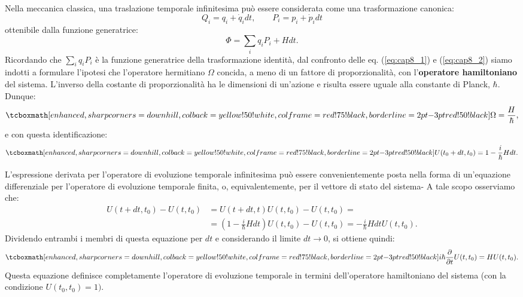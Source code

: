 \documentclass[a4paper,12pt,oneside]{book}
\begin{document}
Nella meccanica classica, una traslazione temporale infinitesima può essere considerata come una trasformazione canonica:
\begin{equation}
Q_i = q_i+\dot{q}_idt, \qquad P_i = p_i+\dot{p}_idt
\end{equation}
ottenibile dalla funzione generatrice:
\begin{equation}
\Phi = \sum _i q_iP_i+ Hdt.
\label{eq:cap8_2}
\end{equation}
Ricordando che $\sum _i q_iP_i$ è la funzione generatrice della trasformazione identità, dal confronto delle eq. (\ref{eq:cap8_1}) e (\ref{eq:cap8_2}) siamo indotti a formulare l'ipotesi che l'operatore hermitiano $\Omega$ concida, a meno di un fattore di proporzionalità, con l'\textbf{operatore hamiltoniano} del sistema. L'inverso della costante di proporzionalità ha le dimensioni di un'azione e risulta essere uguale alla constante di Planck, $\hbar$. Dunque:
	\begin{equation}
		\tcboxmath[enhanced, sharp corners=downhill, colback=yellow!50!white, colframe=red!75!black, borderline={2pt}{-3pt}{red!50!black}]{
		\Omega = \frac{H}{\hbar},
		}
	\end{equation}
e con questa identificazione:
	\begin{equation}
		\tcboxmath[enhanced, sharp corners=downhill, colback=yellow!50!white, colframe=red!75!black, borderline={2pt}{-3pt}{red!50!black}]{
			U(t_0+dt,t_0) =1-\frac{i}{\hbar}Hdt.
			}
	\end{equation}
	
L'espressione derivata per l'operatore di evoluzione temporale infinitesima può essere convenientemente posta nella forma di un'equazione differenziale per l'operatore di evoluzione temporale finita, o, equivalentemente, per il vettore di stato del sistema- A tale scopo osserviamo che:
	\begin{align}
		U(t+dt,t_0)-U(t,t_0)&=  U(t+dt,t)U(t,t_0)-U(t,t_0)= \nonumber\\
		& =\left(1-\frac{i}{\hbar}Hdt \right)U(t,t_0)-U(t,t_0)=-\frac{i}{\hbar}Hdt U(t,t_0).
	\end{align}
Dividendo entrambi i membri di questa equazione per $dt$ e considerando il limite $dt \longrightarrow 0$, si ottiene quindi:
	\begin{equation}
		\tcboxmath[enhanced, sharp corners=downhill, colback=yellow!50!white, colframe=red!75!black, borderline={2pt}{-3pt}{red!50!black}]{
			i\hbar \frac{\partial}{\partial t} U (t, t_0)= H U(t,t_0).
			}
	\label{eq:cap8_3}
	\end{equation}
Questa equazione definisce completamente l'operatore di evoluzione temporale in termini dell'operatore hamiltoniano del sistema (con la condizione $U(t_0,t_0)=1).$\\
\end{document}
